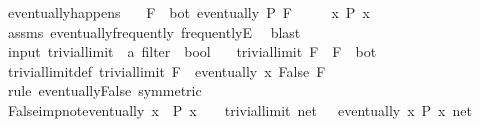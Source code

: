 \begin{isabellebody}
\ eventually{\isacharunderscore}{\kern0pt}happens{\isacharprime}{\kern0pt}{\isacharcolon}{\kern0pt}\isanewline
\ \ \ {\isachardoublequoteopen}F\ {\isasymnoteq}\ bot{\isachardoublequoteclose}\ {\isachardoublequoteopen}eventually\ P\ F{\isachardoublequoteclose}\isanewline
\ \ \ \ \ {\isachardoublequoteopen}{\isasymexists}x{\isachardot}{\kern0pt}\ P\ x{\isachardoublequoteclose}\isanewline
%
\isadelimproof
\ \ %
\endisadelimproof
%
\isatagproof
{}\isamarkupfalse%
\ assms\ eventually{\isacharunderscore}{\kern0pt}frequently\ frequentlyE\ \isamarkupfalse%
\ blast%
\endisatagproof
{\isafoldproof}%
%
\isadelimproof
\isanewline
%
\endisadelimproof
\isanewline
{}\isamarkupfalse%
\ {\isacharparenleft}{\kern0pt}input{\isacharparenright}{\kern0pt}\ trivial{\isacharunderscore}{\kern0pt}limit\ {\isacharcolon}{\kern0pt}{\isacharcolon}{\kern0pt}\ {\isachardoublequoteopen}{\isacharprime}{\kern0pt}a\ filter\ {\isasymRightarrow}\ bool{\isachardoublequoteclose}\isanewline
\ \ \ {\isachardoublequoteopen}trivial{\isacharunderscore}{\kern0pt}limit\ F\ {\isasymequiv}\ F\ {\isacharequal}{\kern0pt}\ bot{\isachardoublequoteclose}\isanewline
\isanewline
{}\isamarkupfalse%
\ trivial{\isacharunderscore}{\kern0pt}limit{\isacharunderscore}{\kern0pt}def{\isacharcolon}{\kern0pt}\ {\isachardoublequoteopen}trivial{\isacharunderscore}{\kern0pt}limit\ F\ {\isasymlongleftrightarrow}\ eventually\ {\isacharparenleft}{\kern0pt}{\isasymlambda}x{\isachardot}{\kern0pt}\ False{\isacharparenright}{\kern0pt}\ F{\isachardoublequoteclose}\isanewline
%
\isadelimproof
\ \ %
\endisadelimproof
%
\isatagproof
{}\isamarkupfalse%
\ {\isacharparenleft}{\kern0pt}rule\ eventually{\isacharunderscore}{\kern0pt}False\ {\isacharbrackleft}{\kern0pt}symmetric{\isacharbrackright}{\kern0pt}{\isacharparenright}{\kern0pt}%
\endisatagproof
{\isafoldproof}%
%
\isadelimproof
\isanewline
%
\endisadelimproof
\isanewline
{}\isamarkupfalse%
\ False{\isacharunderscore}{\kern0pt}imp{\isacharunderscore}{\kern0pt}not{\isacharunderscore}{\kern0pt}eventually{\isacharcolon}{\kern0pt}\ {\isachardoublequoteopen}{\isacharparenleft}{\kern0pt}{\isasymforall}x{\isachardot}{\kern0pt}\ {\isasymnot}\ P\ x\ {\isacharparenright}{\kern0pt}\ {\isasymLongrightarrow}\ {\isasymnot}\ trivial{\isacharunderscore}{\kern0pt}limit\ net\ {\isasymLongrightarrow}\ {\isasymnot}\ eventually\ {\isacharparenleft}{\kern0pt}{\isasymlambda}x{\isachardot}{\kern0pt}\ P\ x{\isacharparenright}{\kern0pt}\ net{\isachardoublequoteclose}\isanewline

\end{isabellebody}

